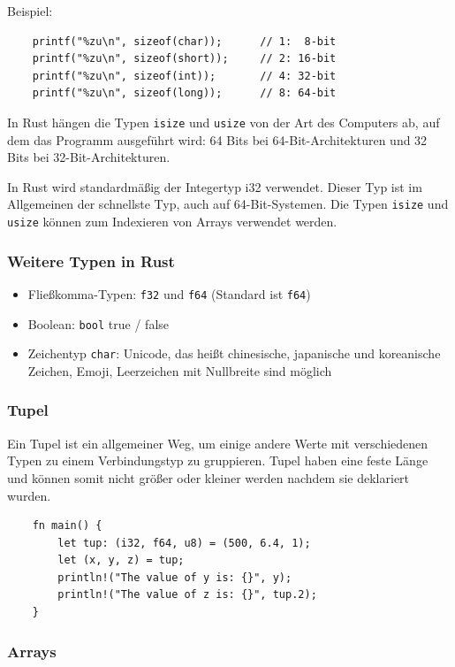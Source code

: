 Beispiel:

\begin{lstlisting}
    printf("%zu\n", sizeof(char));      // 1:  8-bit
    printf("%zu\n", sizeof(short));     // 2: 16-bit
    printf("%zu\n", sizeof(int));       // 4: 32-bit
    printf("%zu\n", sizeof(long));      // 8: 64-bit
\end{lstlisting}

In Rust hängen die Typen \verb"isize" und \verb"usize" von der Art des Computers ab, auf dem das Programm ausgeführt wird: 64 Bits bei 64-Bit-Architekturen und 32 Bits bei 32-Bit-Architekturen.

In Rust wird standardmäßig der Integertyp i32 verwendet. Dieser Typ ist im Allgemeinen der schnellste Typ, auch auf 64-Bit-Systemen. Die Typen \verb"isize" und \verb"usize" können zum Indexieren von Arrays verwendet werden.

\subsubsection{Weitere Typen in Rust}

\begin{itemize}
    \item Fließkomma-Typen: \verb"f32" und \verb"f64" (Standard ist \verb"f64")
    \item Boolean: \verb"bool" true / false
    \item Zeichentyp \verb"char": Unicode, das heißt chinesische, japanische und koreanische Zeichen, Emoji, Leerzeichen mit Nullbreite sind möglich
\end{itemize}

\subsubsection{Tupel}

Ein Tupel ist ein allgemeiner Weg, um einige andere Werte mit verschiedenen Typen zu einem Verbindungstyp zu gruppieren. Tupel haben eine feste Länge und können somit nicht größer oder kleiner werden nachdem sie deklariert wurden.

\begin{lstlisting}
    fn main() {
        let tup: (i32, f64, u8) = (500, 6.4, 1);
        let (x, y, z) = tup;
        println!("The value of y is: {}", y);
        println!("The value of z is: {}", tup.2);
    }
\end{lstlisting}

\subsubsection{Arrays}


